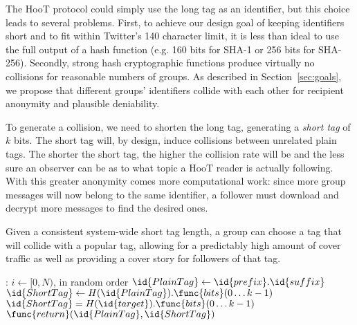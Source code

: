 The HooT protocol could simply use the long tag as an identifier, but
this choice leads to several problems. First, to achieve our design goal
of keeping identifiers short and to fit within Twitter's 140 character
limit, it is less than ideal to use the full output of a hash function
(e.g. 160 bits for SHA-1 or 256 bits for SHA-256). Secondly, strong hash
cryptographic functions produce virtually no collisions for reasonable
numbers of groups. As described in Section~\ref{sec:goals}, we propose
that different groups' identifiers collide with each other for recipient
anonymity and plausible deniability.


To generate a collision, we need to shorten the long tag, generating a
\textit{short tag} of $k$ bits. The short tag will, by design, induce
collisions between unrelated plain tags. The shorter the short tag, the
higher the collision rate will be and the less sure an observer can be
as to what topic a HooT reader is actually following. With this greater
anonymity comes more computational work: since more group messages will
now belong to the same identifier, a follower must download and decrypt
more messages to find the desired ones.

Given a consistent system-wide short tag length, a group can choose a
tag that will collide with a popular tag, allowing for a predictably
high amount of cover traffic as well as providing a cover story for
followers of that tag.
%
\begin{codebox}
:
\zi \For $i \gets [0,N)$, in random order
\zi \Do
\zi $\id{PlainTag} \gets  \id{prefix}.\id{suffix}$
\zi $\id{ShortTag} \gets H(\id{PlainTag}).\func{bits}(0 \ldots k-1)$
\zi \If $\id{ShortTag} = H(\id{target}).\func{bits}(0 \ldots k-1)$
\zi \Then $\func{return} (\id{PlainTag} , \id{ShortTag})$
\zi \End
\End
\end{codebox}

